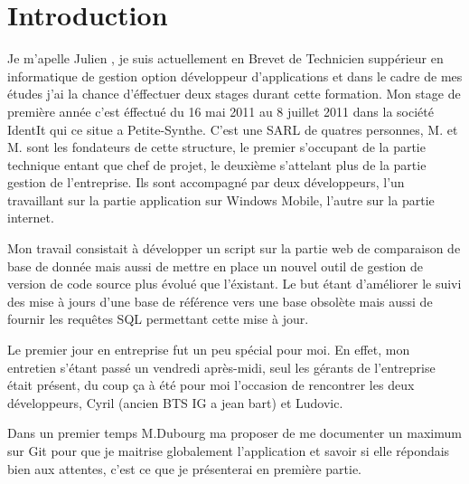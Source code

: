\chapter{Introduction}

Je m'apelle Julien , je suis actuellement en Brevet de Technicien suppérieur en informatique de gestion option développeur d'applications et dans le cadre de
mes études j'ai la chance d'éffectuer deux stages durant cette formation. Mon stage de première année c'est éffectué du 16 mai 2011 au 8 juillet 2011 dans la société IdentIt
qui ce situe a Petite-Synthe. C'est une SARL de quatres personnes, M. et M. sont les fondateurs de cette structure, le premier s'occupant de la
partie technique entant que chef de projet, le deuxième s'attelant plus de la partie gestion de l'entreprise. Ils sont accompagné par deux développeurs, l'un travaillant sur
la partie application sur Windows Mobile, l'autre sur la partie internet.

Mon travail consistait à développer un script sur la partie web de comparaison de base de donnée mais aussi de mettre en place un nouvel outil de gestion de version de code
source plus évolué que l'éxistant. Le but étant d'améliorer le suivi des mise à jours d'une base de référence vers une base obsolète mais aussi de fournir les requêtes SQL
permettant cette mise à jour.

Le premier jour en entreprise fut un peu spécial pour moi. En effet, mon entretien s'étant passé un vendredi après-midi, seul les gérants de l'entreprise était présent, du
coup ça à été pour moi l'occasion de rencontrer les deux développeurs, Cyril (ancien BTS IG a jean bart) et Ludovic.

Dans un premier temps M.Dubourg ma proposer de me documenter un maximum sur Git pour que je maitrise globalement l'application et savoir si elle
répondais bien aux attentes, c'est ce que je présenterai en première partie.

\clearpage

